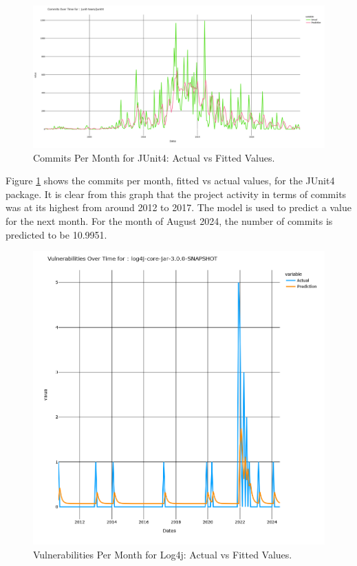 \documentclass[conference]{IEEEtran}
\begin{document}
\begin{figure}
    \centering
    \includegraphics[width=1\linewidth]{JUnit4commits.png}
    \caption{Commits Per Month for JUnit4: Actual vs Fitted Values.} 
    \label{fig:commits}
\end{figure}

Figure \ref{fig:commits} shows the commits per month, fitted vs actual values, for the JUnit4 package. It is clear from this graph that the project activity in terms of commits was at its highest from around 2012 to 2017. The model is used to predict a value for the next month. For the month of August 2024, the number of commits is predicted to be 10.9951. 

\begin{figure}
    \centering
    \includegraphics[width=1\linewidth]{Log4jVuls.png}
    \caption{Vulnerabilities Per Month for Log4j: Actual vs Fitted Values.} 
    \label{fig:vulns}
\end{figure}
\end{document}
